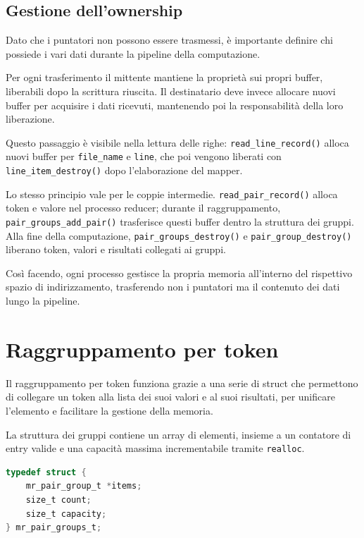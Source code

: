 \documentclass[11pt,a4paper]{article}
\begin{document}
\subsection{Gestione dell'ownership}

Dato che i puntatori non possono essere trasmessi, è importante definire chi possiede i vari dati durante la pipeline della computazione.

Per ogni trasferimento il mittente mantiene la proprietà sui propri buffer, liberabili dopo la scrittura riuscita. Il destinatario deve invece allocare nuovi buffer per acquisire i dati ricevuti, mantenendo poi la responsabilità della loro liberazione.

Questo passaggio è visibile nella lettura delle righe: \texttt{read\_line\_record()} alloca nuovi buffer per \texttt{file\_name} e \texttt{line}, che poi vengono liberati con \texttt{line\_item\_destroy()} dopo l'elaborazione del mapper.

Lo stesso principio vale per le coppie intermedie. \texttt{read\_pair\_record()} alloca token e valore nel processo reducer; durante il raggruppamento, \texttt{pair\_groups\_add\_pair()} trasferisce questi buffer dentro la struttura dei gruppi. Alla fine della computazione, \texttt{pair\_groups\_destroy()} e \texttt{pair\_group\_destroy()} liberano token, valori e risultati collegati ai gruppi.

Così facendo, ogni processo gestisce la propria memoria all'interno del rispettivo spazio di indirizzamento, trasferendo non i puntatori ma il contenuto dei dati lungo la pipeline.

\newpage
\section{Raggruppamento per token}

Il raggruppamento per token funziona grazie a una serie di struct che permettono di collegare un token alla lista dei suoi valori e al suoi risultati, per unificare l'elemento e facilitare la gestione della memoria.

La struttura dei gruppi contiene un array di elementi, insieme a un contatore di entry valide e una capacità massima incrementabile tramite \texttt{realloc}.

\begin{lstlisting}[language=C]
typedef struct {
    mr_pair_group_t *items;
    size_t count;
    size_t capacity;
} mr_pair_groups_t;
\end{lstlisting}
\end{document}
